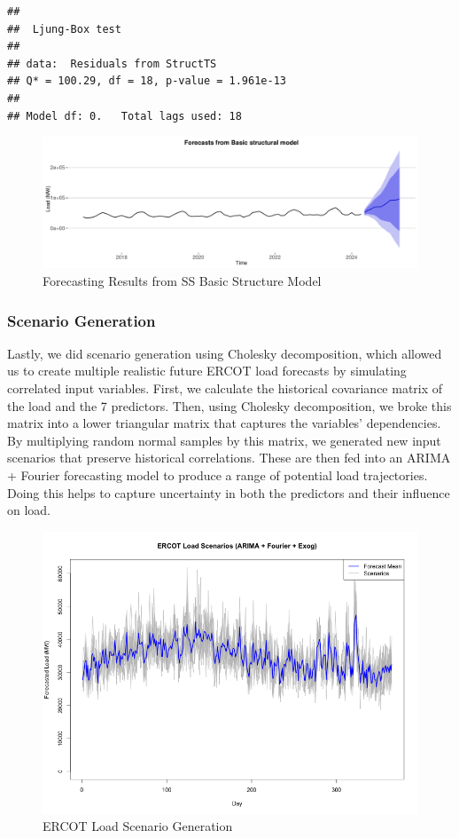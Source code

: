 \documentclass[
]{article}
\begin{document}
\begin{verbatim}
## 
##  Ljung-Box test
## 
## data:  Residuals from StructTS
## Q* = 100.29, df = 18, p-value = 1.961e-13
## 
## Model df: 0.   Total lags used: 18
\end{verbatim}

\begin{figure}
\centering
\includegraphics{FinalProject_Report_files/figure-latex/unnamed-chunk-22-1.pdf}
\caption{Forecasting Results from SS Basic Structure Model}
\end{figure}

\subsubsection{Scenario Generation}\label{scenario-generation}

Lastly, we did scenario generation using Cholesky decomposition, which
allowed us to create multiple realistic future ERCOT load forecasts by
simulating correlated input variables. First, we calculate the
historical covariance matrix of the load and the 7 predictors. Then,
using Cholesky decomposition, we broke this matrix into a lower
triangular matrix that captures the variables' dependencies. By
multiplying random normal samples by this matrix, we generated new input
scenarios that preserve historical correlations. These are then fed into
an ARIMA + Fourier forecasting model to produce a range of potential
load trajectories. Doing this helps to capture uncertainty in both the
predictors and their influence on load.

\begin{figure}
\centering
\includegraphics{ercot_load_scenarios.png}
\caption{ERCOT Load Scenario Generation}
\end{figure}
\end{document}
